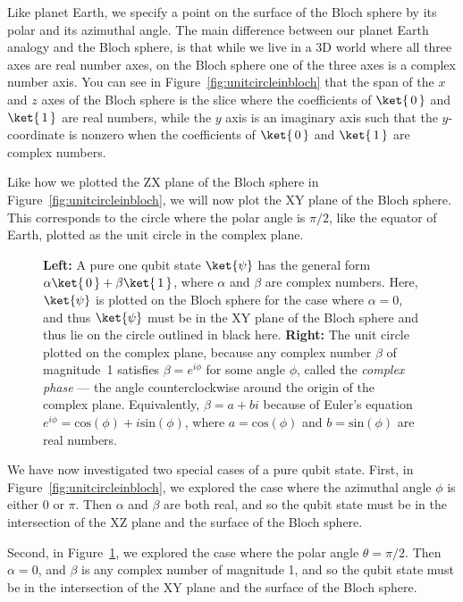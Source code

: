 \documentclass{article}
\theoremstyle{definition}
\newcommand{\kz}[1]{\ket{\,#1\,}}
\begin{document}
Like planet Earth, we specify a point on the surface of the Bloch sphere by its polar and its azimuthal angle.  The main difference between our planet Earth analogy and the Bloch sphere, is that while we live in a 3D world where all three axes are real number axes, on the Bloch sphere one of the three axes is a complex number axis.  You can see in Figure~\ref{fig:unitcircleinbloch} that the span of the $x$ and $z$ axes of the Bloch sphere is the slice where the coefficients of $\kz0$ and $\kz1$ are real numbers, while the $y$ axis is an imaginary axis such that the $y$-coordinate is nonzero when the coefficients of $\kz0$ and $\kz1$ are complex numbers.

Like how we plotted the ZX plane of the Bloch sphere in Figure~\ref{fig:unitcircleinbloch}, we will now plot the XY plane of the Bloch sphere.  This corresponds to the circle where the polar angle is $\pi/2$, like the equator of Earth, plotted as the unit circle in the complex plane.
\begin{figure}[H]
	\caption{\textbf{Left:} A pure one qubit state $\ket{\psi}$ has the general form $\alpha\kz0 + \beta\kz1$, where $\alpha$ and $\beta$ are complex numbers.  Here, $\ket{\psi}$ is plotted on the Bloch sphere for the case where $\alpha = 0$, and thus $\ket{\psi}$ must be in the XY plane of the Bloch sphere and thus lie on the circle outlined in black here.  \textbf{Right:} The unit circle plotted on the complex plane, because any complex number $\beta$ of magnitude~1 satisfies $\beta = e^{i \phi}$ for some angle $\phi$, called the \textit{complex phase} --- the angle counterclockwise around the origin of the complex plane.  Equivalently, $\beta = a + b i$ because of Euler's equation $e^{i \phi} = \text{cos}(\phi) + i \text{sin}(\phi)$, where $a = \text{cos}(\phi)$ and $b = \text{sin}(\phi)$ are real numbers.}
	\label{fig:unitcirclecomplexinbloch}
\end{figure}

We have now investigated two special cases of a pure qubit state.  First, in Figure~\ref{fig:unitcircleinbloch}, we explored the case where the azimuthal angle $\phi$ is either $0$ or $\pi$.  Then $\alpha$ and $\beta$ are both real, and so the qubit state must be in the intersection of the XZ plane and the surface of the Bloch sphere.

Second, in Figure~\ref{fig:unitcirclecomplexinbloch}, we explored the case where the polar angle $\theta = \pi/2$.  Then $\alpha = 0$, and $\beta$ is any complex number of magnitude 1, and so the qubit state must be in the intersection of the XY plane and the surface of the Bloch sphere.
\end{document}
